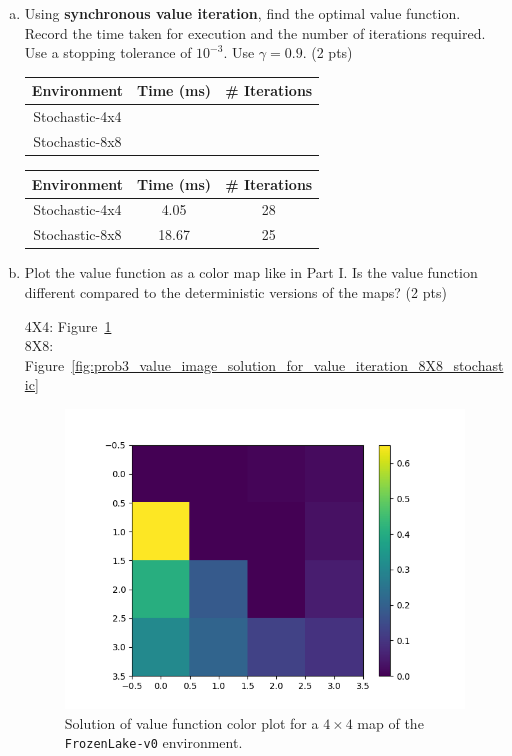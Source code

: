 \documentclass[12pt]{article}
\begin{document}
\begin{enumerate}[a)]
\item Using \textbf{synchronous value iteration}, find the optimal value function. Record
  the time taken for execution and the number of iterations required. Use a
  stopping tolerance of $10^{-3}$. Use $\gamma=0.9$. (2 pts)
\begin{center}
  \begin{tabular}{|c|c|c|}\hline
    {\bf Environment} & {\bf Time (ms)} & {\bf \# Iterations} \\ \hline
    Stochastic-4x4 & & \\ \hline
    Stochastic-8x8 & & \\ \hline
  \end{tabular}
\end{center}

\begin{solution}
\begin{center}
  \begin{tabular}{|c|c|c|}\hline
    {\bf Environment} & {\bf Time (ms)} & {\bf \# Iterations} \\ \hline
    Stochastic-4x4 & 4.05 & 28 \\ \hline
    Stochastic-8x8 & 18.67 & 25 \\ \hline
  \end{tabular}
\end{center}
\end{solution}

\item Plot the value function as a color map like in Part I. Is the
  value function different compared to the deterministic versions of
  the maps? (2 pts)
\begin{solution}
4X4: Figure~\ref{fig:prob3_value_image_solution_for_value_iteration_stochastic} \\
8X8: Figure~\ref{fig:prob3_value_image_solution_for_value_iteration_8X8_stochastic}
\end{solution}

\begin{figure}[h]
  \centering
  \includegraphics[width=.5\textwidth]{figures/stochastic_sync_value_iteration_value_map.png}
  \caption{\label{fig:prob3_value_image_solution_for_value_iteration_stochastic} Solution of value function color plot for a $4 \times 4$ map of the \texttt{FrozenLake-v0} environment.}
\end{figure}
\FloatBarrier


\end{enumerate}
\end{document}

